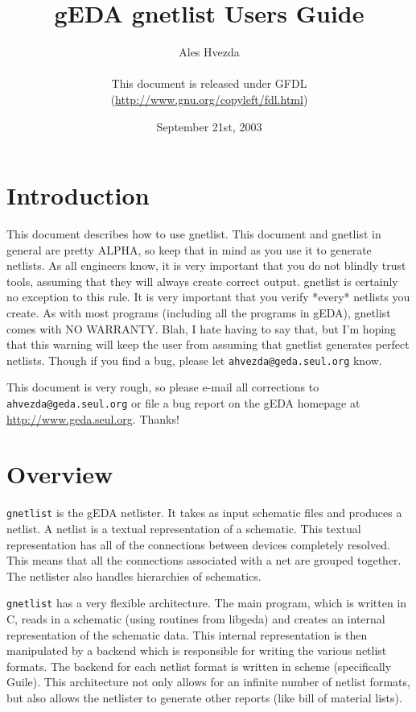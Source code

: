 \documentclass{article}
\title{gEDA gnetlist Users Guide}
\author{Ales Hvezda\\
        \\
        This document is released under GFDL\\ 
        (\url{http://www.gnu.org/copyleft/fdl.html})}
\date{September 21st, 2003}
\begin{document}
\maketitle
\newpage

\tableofcontents
\newpage

\section{Introduction}
This document describes how to use gnetlist.  This document and
gnetlist in general are pretty ALPHA, so keep that in mind as you use
it to generate netlists.  As all engineers know, it is very important
that you do not blindly trust tools, assuming that they will always
create correct output.  gnetlist is certainly no exception to this
rule.  It is very important that you verify *every* netlists you
create.  As with most programs (including all the programs in gEDA),
gnetlist comes with NO WARRANTY.  Blah, I hate having to say that, but
I'm hoping that this warning will keep the user from assuming that
gnetlist generates perfect netlists.  Though if you find a bug, please
let {\tt ahvezda@geda.seul.org} know.

This document is very rough, so please e-mail all corrections to
{\tt ahvezda@geda.seul.org} or file a bug report on the gEDA homepage
at \url{http://www.geda.seul.org}.  Thanks!


\section{Overview}
{\tt gnetlist} is the gEDA netlister.  It takes as input schematic files
and produces a netlist.  A netlist is a textual representation of a
schematic.  This textual representation has all of the connections
between devices completely resolved.  This means that all the
connections associated with a net are grouped together.  The netlister
also handles hierarchies of schematics.

{\tt gnetlist} has a very flexible architecture.  The main program,
which is written in C, reads in a schematic (using routines from
libgeda) and creates an internal representation of the schematic data.
This internal representation is then manipulated by a backend which is
responsible for writing the various netlist formats.  The backend for
each netlist format is written in scheme (specifically Guile).  This
architecture not only allows for an infinite number of netlist
formats, but also allows the netlister to generate other reports (like
bill of material lists).
\end{document}
